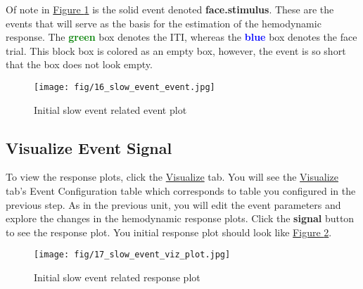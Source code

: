 \documentclass[10pt]{article}
\begin{document}
			Of note in \hyperref[fig:slow_event_plot]{Figure \ref{fig:slow_event_plot}} is the solid event denoted \textbf{face.stimulus}.
			These are the events that will serve as the basis for the estimation of the hemodynamic response.
			The \textcolor{green}{\textbf{green}} box denotes the ITI, whereas the \textcolor{blue}{\textbf{blue}} box denotes the face trial.
			This block box is colored as an empty box, however, the event is so short that the box does not look empty.
			\begin{figure}[ht]
				\centering
				\texttt{[image: fig/16\_slow\_event\_event.jpg]}
				\caption{Initial slow event related event plot}
				\label{fig:slow_event_plot}
			\end{figure}

		\subsection{Visualize Event Signal}
		\label{subsec:u4viz}
			To view the response plots, click the \hyperref[subsubsec:visualize]{Visualize} tab.
			You will see the \hyperref[subsubsec:visualize]{Visualize} tab's Event Configuration table which corresponds to table you configured in the previous step.
			As in the previous unit, you will edit the event parameters and explore the changes in the hemodynamic response plots.
			Click the \textbf{signal} button to see the response plot.
			You initial response plot should look like \hyperref[fig:slow_event_response]{Figure \ref{fig:slow_event_response}}.
			\begin{figure}[ht]
				\centering
				\texttt{[image: fig/17\_slow\_event\_viz\_plot.jpg]}
				\caption{Initial slow event related response plot}
				\label{fig:slow_event_response}
			\end{figure}
	\newpage
\end{document}
